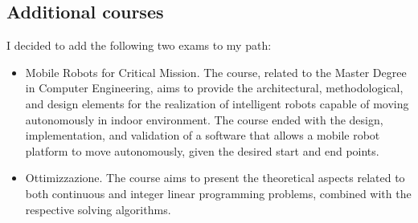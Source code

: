 \subsection{Additional courses}
I decided to add the following two exams to my path:
\begin{itemize}
    \item Mobile Robots for Critical Mission. The course, related to the Master Degree in Computer Engineering, aims to provide the architectural, methodological, and design elements for the realization of intelligent robots capable of moving autonomously in indoor environment. The course ended with the design, implementation, and validation of a software that allows a mobile robot platform to move autonomously, given the desired start and end points.
    \item Ottimizzazione. The course aims to present the theoretical aspects related to both continuous and integer linear programming problems, combined with the respective solving algorithms. 
\end{itemize}
